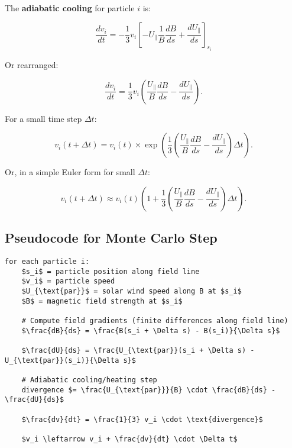 The \textbf{adiabatic cooling} for particle $i$ is:

\begin{equation}
\boxed{
\frac{dv_i}{dt} = -\frac{1}{3} v_i \left[ -U_\parallel \frac{1}{B} \frac{dB}{ds} + \frac{d U_\parallel}{ds} \right]_{s_i}
}
\tag{7}
\end{equation}

Or rearranged:

\begin{equation}
\boxed{
\frac{dv_i}{dt} = \frac{1}{3} v_i \left( \frac{U_\parallel}{B} \frac{dB}{ds} - \frac{d U_\parallel}{ds} \right).
}
\tag{8}
\end{equation}

For a small time step $\Delta t$:

\begin{equation}
v_i(t + \Delta t) = v_i(t) \times \exp\left( \frac{1}{3} \left( \frac{U_\parallel}{B} \frac{dB}{ds} - \frac{d U_\parallel}{ds} \right) \Delta t \right).
\tag{9}
\end{equation}

Or, in a simple Euler form for small $\Delta t$:

\begin{equation}
\boxed{
v_i(t + \Delta t) \approx v_i(t) \left( 1 + \frac{1}{3} \left( \frac{U_\parallel}{B} \frac{dB}{ds} - \frac{d U_\parallel}{ds} \right) \Delta t \right).
}
\tag{10}
\end{equation}

\subsection*{Pseudocode for Monte Carlo Step}

\begin{lstlisting}[language={}, mathescape=true]
for each particle i:
    $s_i$ = particle position along field line
    $v_i$ = particle speed
    $U_{\text{par}}$ = solar wind speed along B at $s_i$
    $B$ = magnetic field strength at $s_i$
    
    # Compute field gradients (finite differences along field line)
    $\frac{dB}{ds} = \frac{B(s_i + \Delta s) - B(s_i)}{\Delta s}$
    
    $\frac{dU}{ds} = \frac{U_{\text{par}}(s_i + \Delta s) - U_{\text{par}}(s_i)}{\Delta s}$
    
    # Adiabatic cooling/heating step
    divergence $= \frac{U_{\text{par}}}{B} \cdot \frac{dB}{ds} - \frac{dU}{ds}$
    
    $\frac{dv}{dt} = \frac{1}{3} v_i \cdot \text{divergence}$
    
    $v_i \leftarrow v_i + \frac{dv}{dt} \cdot \Delta t$
\end{lstlisting}

